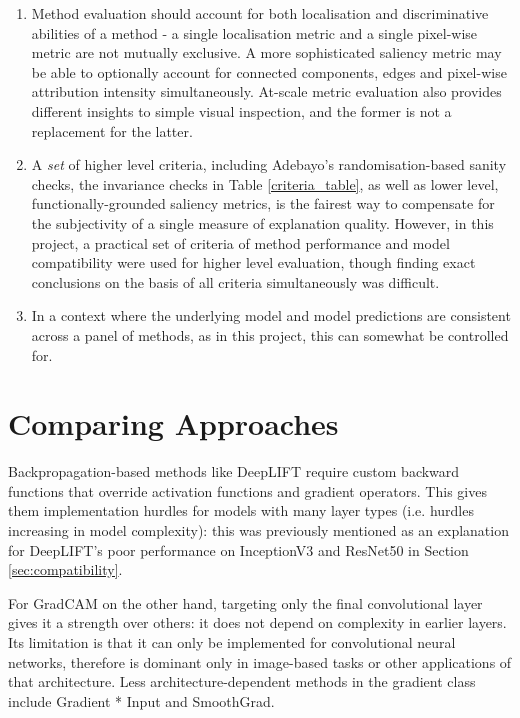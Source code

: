 \documentclass[main]{subfiles}
\begin{document}
\begin{enumerate}
\item Method evaluation should account for both localisation and discriminative abilities of a method - a single localisation metric and a single pixel-wise metric are not mutually exclusive. A more sophisticated saliency metric may be able to optionally account for connected components, edges and pixel-wise attribution intensity simultaneously. At-scale metric evaluation also provides different insights to simple visual inspection, and the former is not a replacement for the latter.
\item A \textit{set} of higher level criteria, including Adebayo's randomisation-based sanity checks, the invariance checks in Table \ref{criteria_table}, as well as lower level, functionally-grounded saliency metrics, is the fairest way to compensate for the subjectivity of a single measure of explanation quality. However, in this project, a practical set of criteria of method performance and model compatibility were used for higher level evaluation, though finding exact conclusions on the basis of all criteria simultaneously was difficult.
\item In a context where the underlying model and model predictions are consistent across a panel of methods, as in this project, this can somewhat be controlled for.

\end{enumerate}



\section{Comparing Approaches}
Backpropagation-based methods like DeepLIFT require custom backward functions that override activation functions and gradient operators. This gives them implementation hurdles for models with many layer types (i.e. hurdles increasing in model complexity): this was previously mentioned as an explanation for DeepLIFT's poor performance on InceptionV3 and ResNet50 in Section \ref{sec:compatibility}.

For GradCAM on the other hand, targeting only the final convolutional layer gives it a strength over others: it does not depend on complexity in earlier layers. Its limitation is that it can only be implemented for convolutional neural networks, therefore is dominant only in image-based tasks or other applications of that architecture. Less architecture-dependent methods in the gradient class include Gradient * Input and SmoothGrad.
\end{document}
